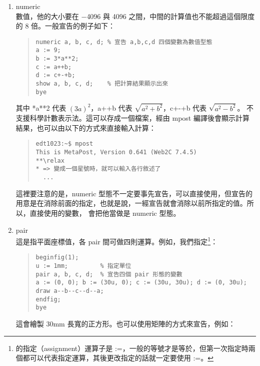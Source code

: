\begin{enumerate}
  \item numeric\\
        數值，他的大小要在 $-$4096 與 4096 之間，中間的計算值也不能超過這個限度的 8 倍。一般宣告的例子如下：

        \begin{quote}
          \begin{verbatim}
numeric a, b, c, d; % 宣告 a,b,c,d 四個變數為數值型態
a := 9;
b := 3*a**2;
c := a++b;
d := c+-+b;
show a, b, c, d;    % 把計算結果顯示出來
bye
\end{verbatim}
        \end{quote}

        其中 {*a**2} 代表 $(3a)^2$，{\ttfamily a++b} 代表 $\sqrt{a^2+b^2}$，{\ttfamily c+-+b} 代表 $\sqrt{a^2-b^2}$。\MP{} 不支援科學計數表示法。這可以存成一個檔案，經由 {\ttfamily mpost} 編譯後會顯示計算結果，也可以由以下的方式來直接輸入計算：

        \begin{quote}
          \begin{verbatim}
edt1023:~$ mpost
This is MetaPost, Version 0.641 (Web2C 7.4.5)
**\relax
* => 變成一個星號時，就可以輸入各行敘述了
  ...
\end{verbatim}
        \end{quote}

        這裡要注意的是，numeric 型態不一定要事先宣告，可以直接使用，但宣告的用意是在消除前面的指定，也就是說，一經宣告就會消除以前所指定的值。所以，直接使用的變數，\MP{} 會把他當做是 numeric 型態。

  \item pair\\
        這是指平面座標值，各 pair 間可做四則運算。例如，我們指定\footnote{\MP{} 的指定（assignment）運算子是 {\ttfamily :=}，一般的等號才是等於，但第一次指定時兩個都可以代表指定運算，其後更改指定的話就一定要使用 {\ttfamily :=}。}：

        \begin{quote}
          \begin{verbatim}
beginfig(1);
u := 1mm;         % 指定單位
pair a, b, c, d;  % 宣告四個 pair 形態的變數
a := (0, 0); b := (30u, 0); c := (30u, 30u); d := (0, 30u);
draw a--b--c--d--a;
endfig;
bye
\end{verbatim}
        \end{quote}

        這會繪製 30mm 長寬的正方形。也可以使用矩陣的方式來宣告，例如：


\end{enumerate}

